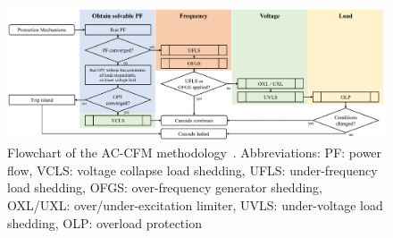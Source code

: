 \begin{figure}
    \centering
    \includegraphics[width=\linewidth]{Figs/NoebelsFlowchart.png}
    \caption{Flowchart of the AC-CFM methodology~\cite{ManchesterNoebels}. Abbreviations: PF: power flow, VCLS: voltage collapse load shedding, UFLS: under-frequency load shedding, OFGS: over-frequency generator shedding, OXL/UXL: over/under-excitation limiter, UVLS: under-voltage load shedding, OLP: overload protection}
    \label{fig:NoebelsFlowchart}
\end{figure}

